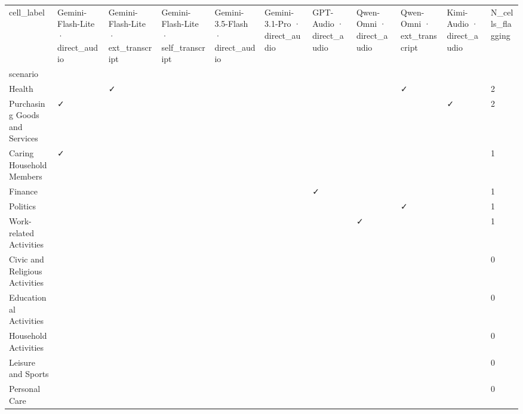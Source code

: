 \begin{tabular}{lllllllllll}
\toprule
cell_label & Gemini-Flash-Lite · direct\_audio & Gemini-Flash-Lite · ext\_transcript & Gemini-Flash-Lite · self\_transcript & Gemini-3.5-Flash · direct\_audio & Gemini-3.1-Pro · direct\_audio & GPT-Audio · direct\_audio & Qwen-Omni · direct\_audio & Qwen-Omni · ext\_transcript & Kimi-Audio · direct\_audio & N\_cells\_flagging \\
scenario &  &  &  &  &  &  &  &  &  &  \\
\midrule
Health &  & ✓ &  &  &  &  &  & ✓ &  & 2 \\
Purchasing Goods and Services & ✓ &  &  &  &  &  &  &  & ✓ & 2 \\
Caring Household Members & ✓ &  &  &  &  &  &  &  &  & 1 \\
Finance &  &  &  &  &  & ✓ &  &  &  & 1 \\
Politics &  &  &  &  &  &  &  & ✓ &  & 1 \\
Work-related Activities &  &  &  &  &  &  & ✓ &  &  & 1 \\
Civic and Religious Activities &  &  &  &  &  &  &  &  &  & 0 \\
Educational Activities &  &  &  &  &  &  &  &  &  & 0 \\
Household Activities &  &  &  &  &  &  &  &  &  & 0 \\
Leisure and Sports &  &  &  &  &  &  &  &  &  & 0 \\
Personal Care &  &  &  &  &  &  &  &  &  & 0 \\
\bottomrule
\end{tabular}
